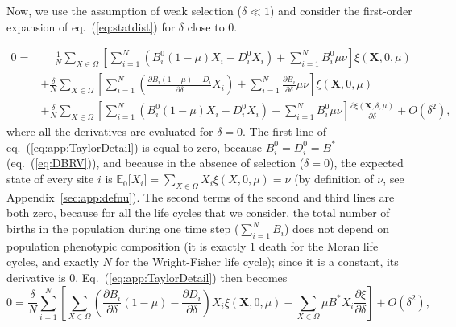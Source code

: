 \documentclass[11pt, letterpaper]{article}
\renewcommand{\eqref}[1]{\textup{{\normalfont eq.~(\ref{#1}}\normalfont)}}
\newcommand{\Eqref}[1]{Eq.~(\ref{#1})}
\newcommand{\derivn}[2]{\frac{\partial #1}{\partial #2}}
\newcommand{\Espzero}[1]{\mathbb{E}_0\big[ #1\big]}%
\newcommand{\bigO}[1]{O\left( #1 \right)}
\newcommand{\appname}[0]{Appendix}
\newcommand{\mutbias}{\nu}
\newcommand{\selstr}{\delta}
\begin{document}
Now, we use the assumption of weak selection ($\selstr \ll 1$) and consider the first-order expansion of \eqref{eq:statdist} for $\selstr$ close to $0$. 

\begin{equation}\label{eq:app:TaylorDetail}
\begin{aligned}
0 = & \phantom{+} \frac{1}{N} \sum_{X\in \Omega} \left[ \sum_{i=1}^N \left( B_i^0 (1-\mu) X_i - D_i^0 X_i \right) + \sum_{i=1}^N B_i^0 \mu \mutbias \right] \xi(\mathbf{X}, 0, \mu) \\
%
& + \frac{\selstr}{N} \sum_{X\in \Omega} \left[ \sum_{i=1}^N \left( \frac{\partial B_i (1-\mu) - D_i}{\partial \selstr} X_i  \right) + \sum_{i=1}^N \frac{\partial B_i}{\partial \selstr} \mu \mutbias \right] \xi(\mathbf{X}, 0, \mu) \\
% 
& + \frac{\selstr}{N} \sum_{X\in \Omega} \left[ \sum_{i=1}^N \left( B_i^0 (1-\mu) X_i - D_i^0 X_i \right) + \sum_{i=1}^N B_i^0 \mu \mutbias \right] \frac{\partial \xi(\mathbf{X}, \selstr, \mu)}{\partial \selstr} + O(\selstr^2),
\end{aligned}
\end{equation}
where all the derivatives are evaluated for $\selstr = 0$. The first line of \eqref{eq:app:TaylorDetail} is equal to zero, because $B_i^0 = D_i^0 = B^*$ (\eqref{eq:DBRV}), and because in the absence of selection ($\selstr =0$), the expected state of every site $i$ is $\Espzero{X_i} = \sum_{X\in \Omega} X_i \xi(X, 0, \mu)= \mutbias$ (by definition of $\mutbias$, see \appname~\ref{sec:app:defnu}). The second terms of the second and third lines are both zero, because for all the life cycles that we consider, the total number of births in the population during one time step ($\sum_{i=1}^N B_i$) does not depend on population phenotypic composition (it is exactly $1$ death for the Moran life cycles, and exactly $N$ for the Wright-Fisher life cycle); since it is a constant, its derivative is $0$. \Eqref{eq:app:TaylorDetail} then becomes
%
\begin{equation}\label{eq:weaksel0}
0 = \frac{\selstr}{N} \sum_{i=1}^N \left[ \sum_{X\in \Omega} \left( \derivn{B_i}{\selstr} (1-\mu) - \derivn{D_i}{\selstr} \right) X_i  \xi(\mathbf{X}, 0, \mu) - \sum_{X\in \Omega} \mu B^* X_i  \derivn{\xi}{\selstr}\right]  + \bigO{\selstr^2},
\end{equation}
\end{document}
